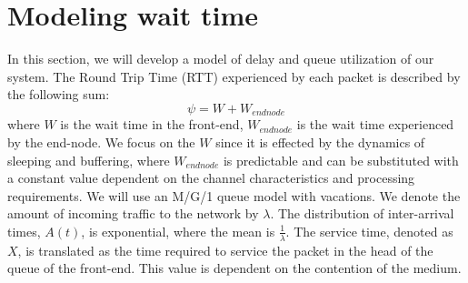 \section{Modeling wait time}\label{sec:model}

In this section, we will develop a model of delay and queue utilization of our system. The Round Trip Time (RTT) experienced by each packet is described by the following sum:
\begin{equation}
\psi = W + W_{end node}
\end{equation}
where $W$ is the wait time in the front-end, $W_{end node}$ is the wait time experienced by the end-node. We focus on the $W$ since it is effected by the dynamics of sleeping and buffering, where $W_{end node}$ is predictable and can be substituted with a constant value dependent on the channel characteristics and processing requirements. We will use an M/G/1 queue model with vacations. We denote the amount of incoming traffic to the network by $\lambda$. The distribution of inter-arrival times, $A(t)$, is exponential, where the mean is $\frac{1}{\lambda}$. The service time, denoted as $X$, is translated as the time required to service the packet in the head of the queue of the front-end. This value is dependent on the contention of the medium.

